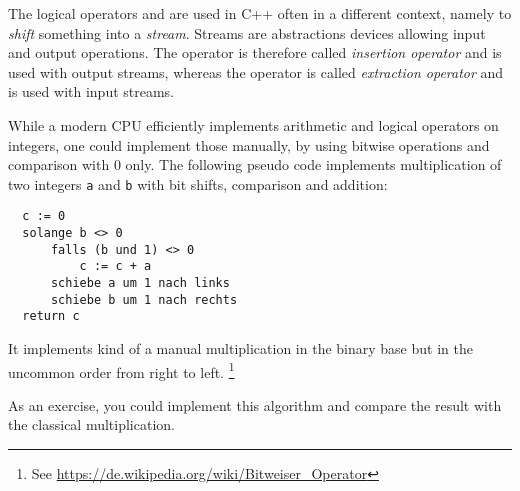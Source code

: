 \begin{rem}
  The logical operators \cpp{<<} and \cpp{>>} are used in C++ often in a different context, namely to \emph{shift} something into a \emph{stream}. Streams are abstractions devices allowing input and output operations. The operator \cpp{<<} is therefore called \emph{insertion operator} and   is used with output streams, whereas the operator \cpp{>>} is called \emph{extraction operator} and is used with input streams.
\end{rem}

\begin{example}
  While a modern CPU efficiently implements arithmetic and logical operators on integers, one could implement those manually, by using bitwise operations and comparison with 0 only. The following pseudo code implements multiplication of two integers \texttt{a} and \texttt{b} with bit shifts, comparison and addition:
  \begin{verbatim}
  c := 0
  solange b <> 0
      falls (b und 1) <> 0
          c := c + a
      schiebe a um 1 nach links
      schiebe b um 1 nach rechts
  return c
  \end{verbatim}
  It implements kind of a manual multiplication in the binary base but in the uncommon order from right to left.
  \footnote{See \url{https://de.wikipedia.org/wiki/Bitweiser_Operator}}

  As an exercise, you could implement this algorithm and compare the result with the classical multiplication.
\end{example}

